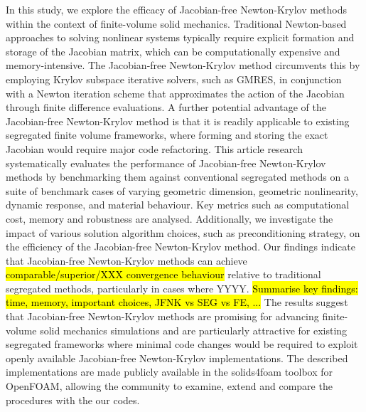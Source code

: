 \documentclass[sn-mathphys,Numbered,draft]{sn-jnl}%
\begin{document}
\abstract
{
In this study, we explore the efficacy of Jacobian-free Newton-Krylov methods within the context of finite-volume solid mechanics.
Traditional Newton-based approaches to solving nonlinear systems typically require explicit formation and storage of the Jacobian matrix, which can be computationally expensive and memory-intensive.
The Jacobian-free Newton-Krylov method circumvents this by employing Krylov subspace iterative solvers, such as GMRES, in conjunction with a Newton iteration scheme that approximates the action of the Jacobian through finite difference evaluations.
A further potential advantage of the Jacobian-free Newton-Krylov method is that it is readily applicable to existing segregated finite volume frameworks, where forming and storing the exact Jacobian would require major code refactoring.
This article research systematically evaluates the performance of Jacobian-free Newton-Krylov methods by benchmarking them against conventional segregated methods on a suite of benchmark cases of varying geometric dimension, geometric nonlinearity, dynamic response, and material behaviour.
Key metrics such as computational cost, memory and robustness are analysed.
Additionally, we investigate the impact of various solution algorithm choices, such as preconditioning strategy, on the efficiency of the Jacobian-free Newton-Krylov method.
Our findings indicate that Jacobian-free Newton-Krylov methods can achieve \hl{comparable/superior/XXX convergence behaviour} relative to traditional segregated methods, particularly in cases where YYYY.
\hl{Summarise key findings: time, memory, important choices, JFNK vs SEG vs FE, ...}
The results suggest that Jacobian-free Newton-Krylov methods are promising for advancing finite-volume solid mechanics simulations and are particularly attractive for existing segregated frameworks where minimal code changes would be required to exploit openly available Jacobian-free Newton-Krylov implementations.
The described implementations are made publicly available in the solids4foam toolbox for OpenFOAM, allowing the community to examine, extend and compare the procedures with the our codes.
}
\end{document}
